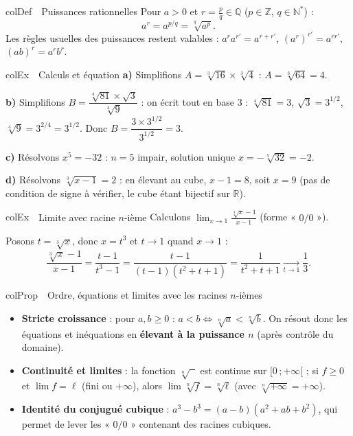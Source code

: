 \documentclass[11pt,a4paper]{article}
\newenvironment{definition}[1][Définition]
  {\begin{fiche}{colDef}{\ding{110}~~#1}}{\end{fiche}}
\newenvironment{propriete}[1][Propriété]
  {\begin{fiche}{colProp}{\ding{72}~~#1}}{\end{fiche}}
\newenvironment{exemple}[1][Exemple]
  {\begin{fiche}{colEx}{\ding{217}~~#1}}{\end{fiche}}
\begin{document}
\begin{definition}[Puissances rationnelles]
Pour $a > 0$ et $r = \frac{p}{q} \in \mathbb{Q}$ ($p \in \mathbb{Z}$, $q \in \mathbb{N}^*$) :
\[
  a^{r} = a^{p/q} = \sqrt[q]{a^p}.
\]
Les règles usuelles des puissances restent valables : $a^r a^{r'} = a^{r + r'}$, $(a^r)^{r'} = a^{rr'}$, $(ab)^r = a^r b^r$.
\end{definition}

\begin{exemple}[Calculs et équation]
\textbf{a)} Simplifions $A = \sqrt[3]{16} \times \sqrt[3]{4}$ : $A = \sqrt[3]{64} = 4$.

\smallskip
\textbf{b)} Simplifions $B = \dfrac{\sqrt[4]{81} \times \sqrt{3}}{\sqrt[4]{9}}$ : on écrit tout en base $3$ : $\sqrt[4]{81} = 3$, $\sqrt{3} = 3^{1/2}$, $\sqrt[4]{9} = 3^{2/4} = 3^{1/2}$. Donc $B = \dfrac{3 \times 3^{1/2}}{3^{1/2}} = 3$.

\smallskip
\textbf{c)} Résolvons $x^5 = -32$ : $n = 5$ impair, solution unique $x = -\sqrt[5]{32} = -2$.

\smallskip
\textbf{d)} Résolvons $\sqrt[3]{x - 1} = 2$ : en élevant au cube, $x - 1 = 8$, soit $x = 9$ (pas de condition de signe à vérifier, le cube étant bijectif sur $\mathbb{R}$).
\end{exemple}

\begin{exemple}[Limite avec racine $n$-ième]
Calculons $\displaystyle\lim_{x \to 1} \frac{\sqrt[3]{x} - 1}{x - 1}$ (forme « $0/0$ »).

\smallskip
Posons $t = \sqrt[3]{x}$, donc $x = t^3$ et $t \to 1$ quand $x \to 1$ :
\[
  \frac{\sqrt[3]{x} - 1}{x - 1}
  = \frac{t - 1}{t^3 - 1}
  = \frac{t - 1}{(t - 1)(t^2 + t + 1)}
  = \frac{1}{t^2 + t + 1}
  \xrightarrow[t \to 1]{} \frac{1}{3}.
\]
\end{exemple}

\begin{propriete}[{Ordre, équations et limites avec les racines $n$-ièmes}]
\begin{itemize}[leftmargin=6mm, itemsep=0.5mm]
  \item \textbf{Stricte croissance} : pour $a, b \geq 0$ : $a < b \iff \sqrt[n]{a} < \sqrt[n]{b}$. On résout donc les équations et inéquations en \textbf{élevant à la puissance $n$} (après contrôle du domaine).
  \item \textbf{Continuité et limites} : la fonction $\sqrt[n]{\phantom{x}}$ est continue sur $[0\,;+\infty[$ ; si $f \geq 0$ et $\lim f = \ell$ (fini ou $+\infty$), alors $\lim \sqrt[n]{f} = \sqrt[n]{\ell}$ (avec $\sqrt[n]{+\infty} = +\infty$).
  \item \textbf{Identité du conjugué cubique} : $a^3 - b^3 = (a - b)(a^2 + ab + b^2)$, qui permet de lever les « $0/0$ » contenant des racines cubiques.
\end{itemize}
\end{propriete}
\end{document}
